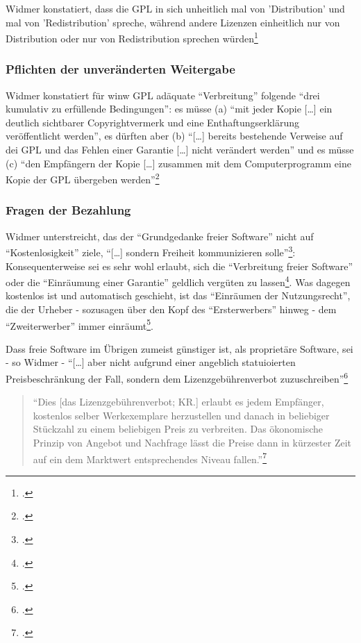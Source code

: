 \documentclass[DIV=calc,BCOR=5mm,11pt,headings=small,oneside,abstract=true, toc=bib]{scrartcl}
\begin{document}
Widmer konstatiert, dass die GPL in sich unheitlich mal von 'Distribution' und
mal von 'Redistribution' spreche, während andere Lizenzen einheitlich nur von
Distribution oder nur von Redistribution sprechen
würden\footcite[vgl.][117 Anm 552]{Widmer2003a}


\subsubsection{Pflichten der unveränderten Weitergabe}

Widmer konstatiert für winw GPL adäquate \enquote{Verbreitung} folgende
\enquote{drei kumulativ zu erfüllende Bedingungen}: es müsse (a)
\enquote{mit jeder Kopie [\ldots] ein deutlich sichtbarer Copyrightvermerk
und eine Enthaftungserklärung veröffentlicht werden}, es dürften aber (b)
\enquote{[\ldots] bereits bestehende Verweise auf dei GPL und das Fehlen
einer Garantie [\ldots] nicht verändert werden} und es müsse (c)
\enquote{den Empfängern der Kopie [\ldots] zusammen mit dem
Computerprogramm eine Kopie der GPL übergeben
werden}\footcite[vgl.][127f]{Widmer2003a}

\subsubsection{Fragen der Bezahlung}
Widmer unterstreicht, das der \enquote{Grundgedanke freier Software} nicht
auf \enquote{Kostenlosigkeit} ziele, \enquote{[\ldots] sondern Freiheit
kommunizieren solle}\footcite[vgl.][131]{Widmer2003a}: Konsequenterweise
sei es sehr wohl erlaubt, sich die \enquote{Verbreitung freier Software}
oder die \enquote{Einräumung einer Garantie} geldlich vergüten zu
lassen\footcite[vgl.][131]{Widmer2003a}. Was dagegen kostenlos ist und
automatisch geschieht, ist das \enquote{Einräumen der Nutzungsrecht}, die
der Urheber - sozusagen über den Kopf des \enquote{Ersterwerbers} hinweg -
dem \enquote{Zweiterwerber} immer
einräumt\footcite[vgl.][131f]{Widmer2003a}.

Dass freie Software im Übrigen zumeist günstiger ist, als proprietäre Software,
sei - so Widmer - \enquote{[\ldots] aber nicht aufgrund einer angeblich
statuioierten Preisbeschränkung der Fall, sondern dem
Lizenzgebührenverbot zuzuschreiben}\footcite[vgl.][132]{Widmer2003a}

\begin{quote} \enquote{Dies [das Lizenzgebührenverbot; KR.] erlaubt es
jedem Empfänger, kostenlos selber Werkexemplare herzustellen und danach
in beliebiger Stückzahl zu einem beliebigen Preis zu verbreiten. Das
ökonomische Prinzip von Angebot und Nachfrage lässt die Preise dann in
kürzester Zeit auf ein dem Marktwert entsprechendes Niveau
fallen.}\footcite[][132]{Widmer2003a}
\end{quote}
\end{document}
